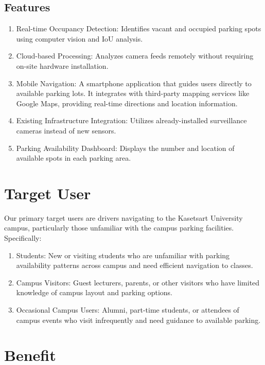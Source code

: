 \subsection{Features}
\label{subsection:features}

\begin{enumerate}[leftmargin=80pt]
    \item Real-time Occupancy Detection: Identifies vacant and occupied parking spots using computer vision and IoU analysis.
    \item Cloud-based Processing: Analyzes camera feeds remotely without requiring on-site hardware installation.
    \item Mobile Navigation: A smartphone application that guides users directly to available parking lots. It integrates with third-party mapping services like Google Maps, providing real-time directions and location information.
    \item Existing Infrastructure Integration: Utilizes already-installed surveillance cameras instead of new sensors.
    \item Parking Availability Dashboard: Displays the number and location of available spots in each parking area.
    \end{enumerate}

\section{Target User}
\label{section:target-user}

Our primary target users are drivers navigating to the Kasetsart University campus, particularly those unfamiliar with the campus parking facilities. Specifically:
\begin{enumerate}[leftmargin=80pt]
\item Students: New or visiting students who are unfamiliar with parking availability patterns across campus and need efficient navigation to classes.
\item Campus Visitors: Guest lecturers, parents, or other visitors who have limited knowledge of campus layout and parking options.
\item Occasional Campus Users: Alumni, part-time students, or attendees of campus events who visit infrequently and need guidance to available parking.
\end{enumerate}
\section{Benefit}
\label{section:benefit}

